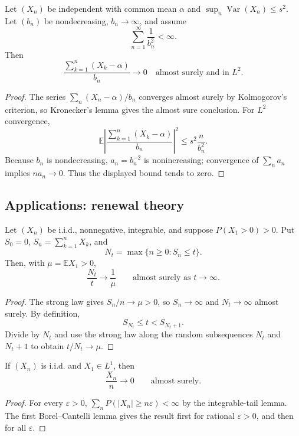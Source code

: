 \begin{thm}
Let $(X_n)$ be independent with common mean $\alpha$ and
$\sup_n\operatorname{Var}(X_n)\leq s^2$. Let $(b_n)$ be nondecreasing,
$b_n\to\infty$, and assume
\[
\sum_{n=1}^{\infty}\frac1{b_n^2}<\infty.
\]
Then
\[
\frac{\sum_{k=1}^{n}(X_k-\alpha)}{b_n}\longrightarrow0
\quad\text{almost surely and in }L^2.
\]
\end{thm}

\begin{proof}
The series
$\sum_n(X_n-\alpha)/b_n$ converges almost surely by Kolmogorov's criterion,
so Kronecker's lemma gives the almost sure conclusion. For $L^2$ convergence,
\[
\mathbb E\left|\frac{\sum_{k=1}^{n}(X_k-\alpha)}{b_n}\right|^2
 \leq s^2\frac n{b_n^2}.
\]
Because $b_n$ is nondecreasing, $a_n=b_n^{-2}$ is nonincreasing; convergence
of $\sum_na_n$ implies $na_n\to0$. Thus the displayed bound tends to zero.
\end{proof}

\subsection{Applications: renewal theory}

\begin{thm}
Let $(X_n)$ be i.i.d., nonnegative, integrable, and suppose
$P(X_1>0)>0$. Put $S_0=0$, $S_n=\sum_{k=1}^{n}X_k$, and
\[
N_t=\max\{n\geq0:S_n\leq t\}.
\]
Then, with $\mu=\mathbb EX_1>0$,
\[
\frac{N_t}{t}\longrightarrow\frac1\mu
\qquad\text{almost surely as }t\to\infty.
\]
\end{thm}

\begin{proof}
The strong law gives $S_n/n\to\mu>0$, so $S_n\to\infty$ and
$N_t\to\infty$ almost surely. By definition,
\[
S_{N_t}\leq t<S_{N_t+1}.
\]
Divide by $N_t$ and use the strong law along the random subsequences
$N_t$ and $N_t+1$ to obtain $t/N_t\to\mu$.
\end{proof}

\begin{lem}
If $(X_n)$ is i.i.d. and $X_1\in L^1$, then
\[
\frac{X_n}{n}\longrightarrow0
\qquad\text{almost surely}.
\]
\end{lem}

\begin{proof}
For every $\varepsilon>0$,
$\sum_nP(|X_n|\geq n\varepsilon)<\infty$ by the integrable-tail lemma. The
first Borel--Cantelli lemma gives the result first for rational
$\varepsilon>0$, and then for all $\varepsilon$.
\end{proof}

